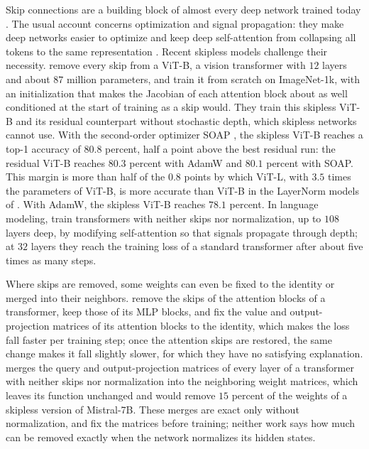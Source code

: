 \documentclass[10pt]{article}
\theoremstyle{definition}
\theoremstyle{remark}
\begin{document}
Skip connections are a building block of almost every deep network trained today \citep{he2016resnet,vaswani2017attention}. The usual account concerns optimization and signal propagation: they make deep networks easier to optimize \citep{he2016resnet,macdonald2023skip} and keep deep self-attention from collapsing all tokens to the same representation \citep{dong2021rank}. Recent skipless models challenge their necessity. \citet{ji2026cutting} remove every skip from a ViT-B, a vision transformer with $12$ layers and about $87$ million parameters, and train it from scratch on ImageNet-1k, with an initialization that makes the Jacobian of each attention block about as well conditioned at the start of training as a skip would. They train this skipless ViT-B and its residual counterpart without stochastic depth, which skipless networks cannot use. With the second-order optimizer SOAP \citep{vyas2025soap}, the skipless ViT-B reaches a top-1 accuracy of $80.8$ percent, half a point above the best residual run: the residual ViT-B reaches $80.3$ percent with AdamW and $80.1$ percent with SOAP. This margin is more than half of the $0.8$ points by which ViT-L, with $3.5$ times the parameters of ViT-B, is more accurate than ViT-B in the LayerNorm models of \citet{zhu2025dyt}. With AdamW, the skipless ViT-B reaches $78.1$ percent. In language modeling, \citet{he2023shortcuts} train transformers with neither skips nor normalization, up to $108$ layers deep, by modifying self-attention so that signals propagate through depth; at $32$ layers they reach the training loss of a standard transformer after about five times as many steps.

Where skips are removed, some weights can even be fixed to the identity or merged into their neighbors. \citet{he2024simplifying} remove the skips of the attention blocks of a transformer, keep those of its MLP blocks, and fix the value and output-projection matrices of its attention blocks to the identity, which makes the loss fall faster per training step; once the attention skips are restored, the same change makes it fall slightly slower, for which they have no satisfying explanation. \citet{graef2024tricks} merges the query and output-projection matrices of every layer of a transformer with neither skips nor normalization into the neighboring weight matrices, which leaves its function unchanged and would remove $15$ percent of the weights of a skipless version of Mistral-7B. These merges are exact only without normalization, and \citet{he2024simplifying} fix the matrices before training; neither work says how much can be removed exactly when the network normalizes its hidden states.
\end{document}
